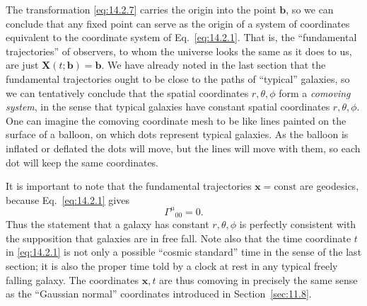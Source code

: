 The transformation \eqref{eq:14.2.7} carries the origin into the point
\(\mathbf{b}\), so we can conclude that any fixed point can serve as the
origin of a system of coordinates equivalent to the coordinate system of
Eq.~\eqref{eq:14.2.1}. That is, the ``fundamental trajectories'' of
observers, to whom the universe looks the same as it does to us, are just
\(\mathbf{X}(t;\mathbf{b})=\mathbf{b}\). We have already noted in the last
section that the fundamental trajectories ought to be close to the paths of
``typical'' galaxies, so we can tentatively conclude that the spatial
coordinates \(r,\theta,\phi\) form a \emph{comoving system}, in the sense
that typical galaxies have constant spatial coordinates \(r,\theta,\phi\).
One can imagine the comoving coordinate mesh to be like lines painted on the
surface of a balloon, on which dots represent typical galaxies. As the
balloon is inflated or deflated the dots will move, but the lines will move
with them, so each dot will keep the same coordinates.

It is important to note that the fundamental trajectories
\(\mathbf{x}=\text{const}\) are geodesics, because Eq.~\eqref{eq:14.2.1}
gives
\begin{equation}
  \Gamma^\mu{}_{00}=0.
  \tag{14.2.8}\label{eq:14.2.8}
\end{equation}
Thus the statement that a galaxy has constant \(r,\theta,\phi\) is perfectly
consistent with the supposition that galaxies are in free fall. Note also
that the time coordinate \(t\) in \eqref{eq:14.2.1} is not only a possible
``cosmic standard'' time in the sense of the last section; it is also the
proper time told by a clock at rest in any typical freely falling galaxy.
The coordinates \(\mathbf{x},t\) are thus comoving in precisely the same
sense as the ``Gaussian normal'' coordinates introduced in
Section~\ref{sec:11.8}.

